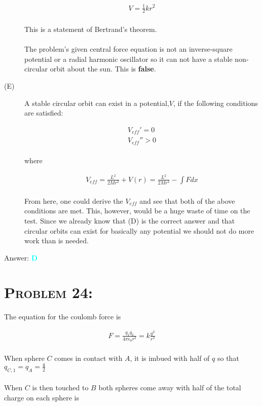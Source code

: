 \documentclass{article}
\begin{document}
\begin{description}
\begin{gather}
V = \frac{1}{2} k r^{2}\nonumber
\end{gather}
\\
This is a statement of Bertrand's theorem. \\
\\
The problem's given central force equation is not an inverse-square potential or a radial harmonic oscillator so it can not have a stable non-circular orbit about the sun. This is \textbf{false}.

\item[(E)] A stable circular orbit can exist in a potential,$V$, if the following conditions are satisfied:

\begin{gather}
V_{eff}' = 0\\
V_{eff}'' > 0
\end{gather}
\\
where 

\begin{gather}
V_{eff} = \frac{L^{2}}{2Mr^{2}} + V(r) = \frac{L^{2}}{2Mr^{2}} - \int{F}dx
\end{gather} 
\\
From here, one could derive the $V_{eff}$ and see that both of the above conditions are met. This, however, would be a huge waste of time on the test. Since we already know that (D) is the correct answer and that circular orbits can exist for basically any potential we should not do more work than is needed. 
\\
\end{description}

Answer: \textbf{\textcolor{cyan}D}\\


\section{\textsc{Problem 24:}} The equation for the coulomb force is 

\begin{gather}
F = \frac{q_{1}q_{2}}{4 \pi \epsilon_{0} r^{2}} = k \frac{q^{2}}{r^{2}}\nonumber
\end{gather}
\\
When sphere $C$ comes in contact with $A$, it is imbued with half of $q$ so that $q_{C,1} = q_{A} = \frac{q}{2}$\\
\\
When $C$ is then touched to $B$ both spheres come away with half of the total charge on each sphere is
\end{document}
